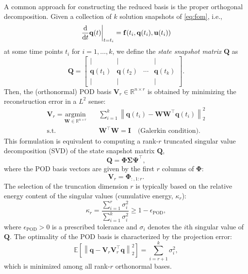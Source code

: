 A common approach for constructing the reduced basis is the proper orthogonal decomposition. Given a collection of $k$ solution snapshots of \eqref{eq:fom}, i.e.,\\$$\dv{}{t}\mathbf{q}(t)\bigg\rvert_{t=t_i}=\mathbf{f}(t_i,\mathbf{q}(t_i),\mathbf{u}(t_i))$$ at some time points $t_i$ for $i=1,\dots,k$, we define the \textit{state snapshot matrix} $\mathbf{Q}$ as\\
\begin{equation}
    \mathbf{Q} = \begin{bmatrix}
                    | & | & & | \\
                    \mathbf{q}(t_1) & \mathbf{q}(t_2) & \cdots & \mathbf{q}(t_{k}) \\
                    | & | & & |
                 \end{bmatrix}.
    \label{eq:snapshot_matrix}
\end{equation}
Then, the (orthonormal) POD basis $\mathbf{V}_r \in \mathbb{R}^{n \times r}$ is obtained by minimizing the reconstruction error in a $L^2$ sense:\\
\begin{equation}
\begin{aligned}
    \mathbf{V}_r = \underset{\mathbf{W} \in \mathbb{R}^{n \times r}}{\text{argmin}} \quad & \sum_{i=1}^k \left\|\mathbf{q}(t_i) - \mathbf{W}\mathbf{W}^\top\mathbf{q}(t_i)\right\|_2^2 \\
    \text{s.t.} \quad & \mathbf{W}^\top\mathbf{W} = \mathbf{I} \quad \text{(Galerkin condition)}.
\end{aligned}
\label{eq:pod_opt}
\end{equation}
This formulation is equivalent to computing a rank-$r$ truncated singular value decomposition (SVD) of the state snapshot matrix $\mathbf{Q}$,\\
$$\mathbf{Q} = \bm{\Phi}\bm{\Sigma}\bm{\Psi}^\top,$$
where the POD basis vectors are given by the first $r$ columns of $\bm{\Phi}$:\\
\begin{equation}
    \mathbf{V}_r = \bm{\Phi}_{:,1:r}.
\end{equation}
The selection of the truncation dimension $r$ is typically based on the relative energy content of the singular values (cumulative energy, $\kappa_r$):\\
\begin{equation}
    \kappa_r=\dfrac{\displaystyle\sum_{i=1}^r \sigma_i^2}{\displaystyle\sum_{i=1}^k \sigma_i^2} \geq 1 - \epsilon_{\text{POD}},
    \label{eq:pod_trunc}
\end{equation}
where $\epsilon_{\text{POD}} > 0$ is a prescribed tolerance and $\sigma_i$ denotes the $i$th singular value of $\mathbf{Q}$. The optimality of the POD basis is characterized by the projection error:\\
\begin{equation}
    \mathbb{E}\left[\left\|\mathbf{q} - \mathbf{V}_r^{}\mathbf{V}_r^\top\mathbf{q}\right\|_2^2\right] = \sum_{i=r+1}^k \sigma_i^2,
    \label{eq:pod_error}
\end{equation}
which is minimized among all rank-$r$ orthonormal bases.

